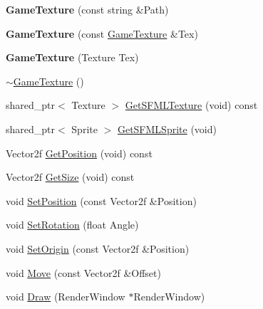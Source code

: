 \begin{DoxyCompactItemize}
\item 
\mbox{\label{class_engine_1_1_core_1_1_game_texture_ae9eb069dd4a60ad5af6e19ca35432ea2}} 
{\bfseries Game\+Texture} (const string \&Path)
\item 
\mbox{\label{class_engine_1_1_core_1_1_game_texture_a5d6076b052118c2212b103cbdf3ea836}} 
{\bfseries Game\+Texture} (const \hyperlink{class_engine_1_1_core_1_1_game_texture}{Game\+Texture} \&Tex)
\item 
\mbox{\label{class_engine_1_1_core_1_1_game_texture_aac115d213538922ab88a656b6780b6b3}} 
{\bfseries Game\+Texture} (Texture Tex)
\item 
\hyperlink{class_engine_1_1_core_1_1_game_texture_a37c2ee2ebfdfc3301b6070d2df10d59a}{$\sim$\+Game\+Texture} ()
\item 
shared\+\_\+ptr$<$ Texture $>$ \hyperlink{class_engine_1_1_core_1_1_game_texture_a18a4679d1538d7390b613d16f3b4bd5a}{Get\+S\+F\+M\+L\+Texture} (void) const
\item 
shared\+\_\+ptr$<$ Sprite $>$ \hyperlink{class_engine_1_1_core_1_1_game_texture_aec2df0beae7b8693160e20c1fd3588ac}{Get\+S\+F\+M\+L\+Sprite} (void)
\item 
Vector2f \hyperlink{class_engine_1_1_core_1_1_game_texture_a7bf5f66f2fd297fd9d757e8f9f0cc5e8}{Get\+Position} (void) const
\item 
Vector2f \hyperlink{class_engine_1_1_core_1_1_game_texture_a7ce550b437a2b17b8cf574c6a91b6f60}{Get\+Size} (void) const
\item 
void \hyperlink{class_engine_1_1_core_1_1_game_texture_ae1f94e0f1b86e99ed4508ccdda4872d6}{Set\+Position} (const Vector2f \&Position)
\item 
void \hyperlink{class_engine_1_1_core_1_1_game_texture_a5ed78714df6128f09c35c25e2271dc05}{Set\+Rotation} (float Angle)
\item 
void \hyperlink{class_engine_1_1_core_1_1_game_texture_aa01df5d689abf48b1d442da329485eeb}{Set\+Origin} (const Vector2f \&Position)
\item 
void \hyperlink{class_engine_1_1_core_1_1_game_texture_af0169ac026c5b15cb3195d1199b13d33}{Move} (const Vector2f \&Offset)
\item 
void \hyperlink{class_engine_1_1_core_1_1_game_texture_a108f525f52213ec94dd9a63d1be9dd0f}{Draw} (Render\+Window $\ast$Render\+Window)
\end{DoxyCompactItemize}


